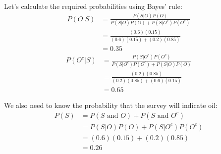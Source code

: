 \documentclass{beamer}\usepackage[]{graphicx}\usepackage[]{color}
\begin{document}
\begin{darkframes}
    \begin{frame}
      Let's calculate the required probabilities using Bayes' rule:
      \begin{align*}
        P(O|S) &= \frac{P(S|O)P(O)}{P(S|O)P(O) + P(S|O^c)P(O^c)} \\
        &= \frac{(0.6)(0.15)}{(0.6)(0.15) + (0.2)(0.85)} \\
        &= 0.35
      \end{align*}
      \begin{align*}
        P(O^c|S) &= \frac{P(S|O^c)P(O^c)}{P(S|O^c)P(O^c) + P(S|O)P(O)} \\
        &= \frac{(0.2)(0.85)}{(0.2)(0.85) + (0.6)(0.15)} \\
        &= 0.65
      \end{align*}
    \end{frame}

    \begin{frame}
      We also need to know the probability that the survey will indicate oil:
      \begin{align*}
        P(S) &= P(\text{$S$ and $O$}) + P(\text{$S$ and $O^c$}) \\
        &= P(S|O)P(O) + P(S|O^c)P(O^c) \\
        &= (0.6)(0.15) + (0.2)(0.85) \\
        &= 0.26
      \end{align*}
    \end{frame}


\end{darkframes}
\end{document}

